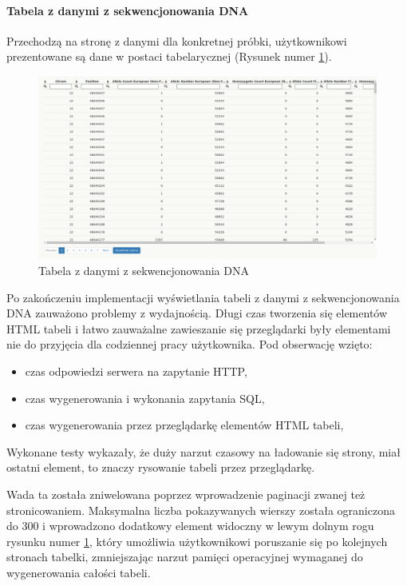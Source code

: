 \documentclass[a4paper,12pt,twoside]{article}
\begin{document}
\newpage
\paragraph{Tabela z danymi z sekwencjonowania DNA}
Przechodzą na stronę z danymi dla konkretnej próbki, użytkownikowi prezentowane są
dane w postaci tabelarycznej (Rysunek numer \ref{fig:table1pic}).

\begin{figure}[h!]
\includegraphics[width=\linewidth]{obrazy/aplikacja/table1.png}
\caption{Tabela z danymi z sekwencjonowania DNA}
\label{fig:table1pic}
\end{figure}

Po zakończeniu implementacji wyświetlania tabeli z danymi z sekwencjonowania DNA zauważono problemy z wydajnością.
Długi czas tworzenia się elementów HTML tabeli i łatwo zauważalne zawieszanie się przeglądarki
były elementami nie do przyjęcia dla codziennej pracy użytkownika.
Pod obserwację wzięto:
\begin{itemize}
\item czas odpowiedzi serwera na zapytanie HTTP,
\item czas wygenerowania i wykonania zapytania SQL,
\item czas wygenerowania przez przeglądarkę elementów HTML tabeli,
\end{itemize}
Wykonane testy wykazały, że duży narzut czasowy na ładowanie się strony, miał ostatni
element, to znaczy rysowanie tabeli przez przeglądarkę.

Wada ta została zniwelowana poprzez wprowadzenie paginacji zwanej też stronicowaniem.
Maksymalna liczba pokazywanych wierszy została ograniczona do 300 i wprowadzono dodatkowy
element widoczny w lewym dolnym rogu rysunku numer \ref{fig:table1pic}, który umożliwia
użytkownikowi poruszanie się po kolejnych stronach tabelki, zmniejszając narzut
pamięci operacyjnej wymaganej do wygenerowania całości tabeli.
\newline
\end{document}
